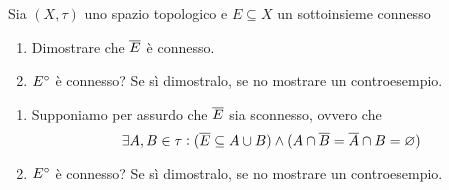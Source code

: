 \begin{vares}
  Sia $ (X, \tau) $ uno spazio topologico e $ E \subseteq X $ un sottoinsieme connesso
  \begin{enumerate}[label = (\roman*)]
  \item Dimostrare che $ \overline{E} $ è connesso.
  \item $ {E}^{\circ} $ è connesso? Se sì dimostralo, se no mostrare un controesempio.
  \end{enumerate}
\end{vares}
%
\begin{enumerate}[label = (\roman*)]
\item Supponiamo per assurdo che $ \overline{E} $ sia sconnesso, ovvero che \[\exists A, B \in \tau : (\overline{E} \subseteq A \cup B) \wedge (A \cap \overline{B} = \overline{A} \cap B = \varnothing)\]
\item $ {E}^{\circ} $ è connesso? Se sì dimostralo, se no mostrare un controesempio.
\end{enumerate}

